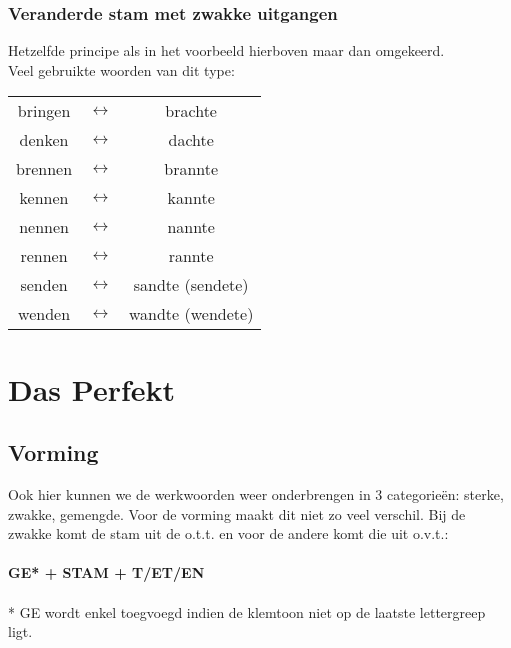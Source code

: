 \documentclass[main.tex]{subfiles}
\begin{document}
\subsubsection{Veranderde stam met zwakke uitgangen}
Hetzelfde principe als in het voorbeeld hierboven maar dan omgekeerd.\\
Veel gebruikte woorden van dit type:\\
\begin{tabular}{c c c}

bringen & $\leftrightarrow$ & brachte \\ 

denken & $\leftrightarrow$ & dachte \\ 

brennen & $\leftrightarrow$ & brannte \\ 

kennen & $\leftrightarrow$ & kannte \\ 

nennen & $\leftrightarrow$ & nannte \\ 

rennen & $\leftrightarrow$ & rannte \\ 
 
senden & $\leftrightarrow$ & sandte (sendete) \\ 

wenden & $\leftrightarrow$ & wandte (wendete) \\ 
\end{tabular}
\section{Das Perfekt}
\subsection{Vorming}
Ook hier kunnen we de werkwoorden weer onderbrengen in 3 categorieën: sterke, zwakke, gemengde. Voor de vorming maakt dit niet zo veel verschil. Bij de zwakke komt de stam uit de o.t.t. en voor de andere komt die uit o.v.t.:
\\
\\
\textbf{GE* + STAM + T/ET/EN}
\\
\\ * GE wordt enkel toegvoegd indien de klemtoon niet op de laatste lettergreep ligt.
\end{document}
